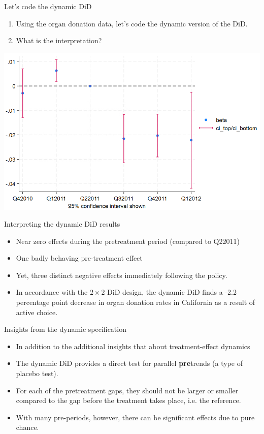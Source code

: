\documentclass[notes,11pt, aspectratio=169]{beamer}
\begin{document}
\begin{frame}{Let's code the dynamic DiD}
    \begin{enumerate}
        \item Using the organ donation data, let's code the dynamic version of the DiD.
        \item What is the interpretation?
    \end{enumerate}
    \vspace{1cm}
    \begin{center}
        \includegraphics[width=0.6\linewidth]{24_DiDLecture/24_DiDLecture_DynamicDiD.png}
    \end{center}
\end{frame}

\begin{frame}{Interpreting the dynamic DiD results}
\begin{itemize}
\item Near zero effects during the pretreatment period (compared to Q22011)
\item One badly behaving pre-treatment effect
\item Yet, three distinct negative effects immediately following the policy.
\item In accordance with the $2\times2$ DiD design, the dynamic DiD finds a -2.2 percentage point decrease in organ donation rates in California as a result of active choice.
\end{itemize}
\end{frame}


\begin{frame}{Insights from the dynamic specification}
\begin{itemize}
\item In addition to the additional insights that about treatment-effect dynamics
\item The dynamic DiD provides a direct test for parallel \textbf{pre}trends (a type of placebo test).
\item For each of the pretreatment gaps, they should not be larger or smaller compared to the gap before the treatment takes place, i.e. the reference.
\item With many pre-periods, however, there can be significant effects due to pure chance. 
\end{itemize}
\end{frame}
\end{document}
